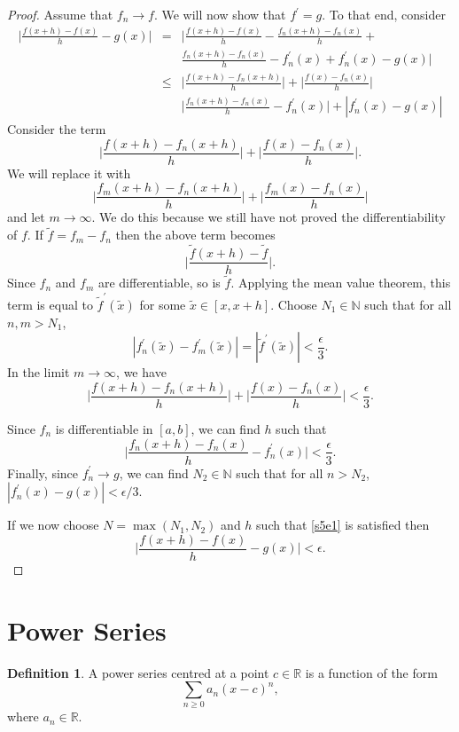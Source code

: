 \documentclass{article}
\theoremstyle{plain}
\numberwithin{thm}{section}
\theoremstyle{plain}
\numberwithin{prop}{section}
\theoremstyle{definition}
\newtheorem{defn}{Definition}
\numberwithin{defn}{section}
\theoremstyle{remark}
\numberwithin{equation}{section}
\newcommand{\op}{\prime}
\begin{document}
\begin{proof}
Assume that $f_n \rightarrow f$. We will now show that $f^\op = g$. To that end,
consider
\begin{eqnarray*}
\Big|\frac{f(x+h) - f(x)}{h} - g(x)\Big| &=& \Big|\frac{f(x+h)-f(x)}{h} -
\frac{f_n(x+h)-f_n(x)}{h} + \\
 & & \frac{f_n(x+h)-f_n(x)}{h} - f_n^\op(x) + f_n^\op(x) - g(x)\Big| \\
  &\le& \Big|\frac{f(x+h)-f_n(x+h)}{h}\Big| + \Big|\frac{f(x)-f_n(x)}{h}\Big|\\
  & & \Big|\frac{f_n(x+h)-f_n(x)}{h} - f_n^\op(x)\Big| + |f_n^\op(x)-g(x)|
\end{eqnarray*}
Consider the term
\[
\Big|\frac{f(x+h)-f_n(x+h)}{h}\Big| + \Big|\frac{f(x)-f_n(x)}{h}\Big|.
\]
We will replace it with
\[
\Big|\frac{f_m(x+h)-f_n(x+h)}{h}\Big| + \Big|\frac{f_m(x)-f_n(x)}{h}\Big|
\]
and let $m \rightarrow \infty$. We do this because we still have not proved 
the differentiability of $f$. If $\tilde{f} = f_m - f_n$ then the above term
becomes
\[
\Big|\frac{\tilde{f}(x+h) - \tilde{f}}{h}\Big|.
\]
Since $f_n$ and $f_m$ are differentiable, so is $\tilde{f}$. Applying the mean
value theorem, this term is equal to $\tilde{f}^\op(\tilde{x})$ for some 
$\tilde{x} \in [x, x+h]$. Choose $N_1 \in \mathbb{N}$ such that for all 
$n, m > N_1$, 
\[
|f_n^\op(\tilde{x}) - f_m^\op(\tilde{x})| = |\tilde{f}^\op(
\tilde{x})| < \frac{\epsilon}{3}.
\]
In the limit $m \rightarrow \infty$, we have
\[
\Big|\frac{f(x+h)-f_n(x+h)}{h}\Big| + \Big|\frac{f(x)-f_n(x)}{h}\Big| < 
\frac{\epsilon}{3}.
\]

Since $f_n$ is differentiable in $[a, b]$, we can find $h$ such that
\begin{equation}\label{s5e1}
\Big|\frac{f_n(x+h)-f_n(x)}{h} - f_n^\op(x)\Big| < \frac{\epsilon}{3}.
\end{equation}
Finally, since $f_n^\op \rightarrow g$, we can find $N_2 \in \mathbb{N}$ such
that for all $n > N_2$, $|f_n^\op(x) - g(x)| < \epsilon/3$.

If we now choose $N = \max(N_1, N_2)$ and $h$ such that \eqref{s5e1} is 
satisfied then
\[
\Big|\frac{f(x+h) - f(x)}{h} - g(x)\Big| < \epsilon.
\]
\end{proof}

\section{Power Series}\label{s6}
\begin{defn}\label{s6d1}
A power series centred at a point $c \in \mathbb{R}$ is a function of the form
\[
\sum_{n \ge 0}a_n(x - c)^n,
\]
where $a_n \in \mathbb{R}$.
\end{defn}
\end{document}

